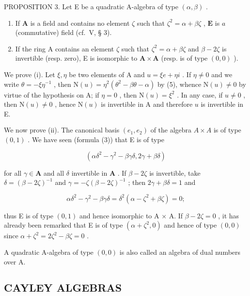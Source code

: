 PROPOSITION 3. Let E be a quadratic A-algebra of type \((\alpha, \beta)\) .

\begin{enumerate}
\def\labelenumi{(\roman{enumi})}
\item
  If \(\mathbf{A}\) is a field and contains no element \(\zeta\) such that \(\zeta^2 = \alpha + \beta \zeta\) , \(\mathbf{E}\) is \(a\) (commutative) field (cf.~V, § 3).
\item
  If the ring A contains an element \(\zeta\) such that \(\zeta^2 = \alpha + \beta\zeta\) and \(\beta - 2\zeta\) is invertible (resp. zero), E is isomorphic to \(\mathbf{A} \times \mathbf{A}\) (resp. is of type \((0,0)\) ).
\end{enumerate}

We prove (i). Let \(\xi, \eta\) be two elements of A and \(u = \xi e + \eta i\) . If \(\eta \neq 0\) and we write \(\theta = -\xi \eta^{-1}\) , then \(\mathrm{N}(u) = \eta^2 (\theta^2 - \beta \theta - \alpha)\) by (5), whence \(\mathrm{N}(u) \neq 0\) by virtue of the hypothesis on A; if \(\eta = 0\) , then \(\mathrm{N}(u) = \xi^2\) . In any case, if \(u \neq 0\) , then \(\mathrm{N}(u) \neq 0\) , hence \(\mathrm{N}(u)\) is invertible in A and therefore \(u\) is invertible in E.

We now prove (ii). The canonical basis \((e_{1}, e_{2})\) of the algebra \(A \times A\) is of type \((0, 1)\) . We have seen (formula (3)) that E is of type

\[
(\alpha \delta^ {2} - \gamma^ {2} - \beta \gamma \delta , 2 \gamma + \beta \delta)
\]

for all \(\gamma \in \mathbf{A}\) and all \(\delta\) invertible in \(\mathbf{A}\) . If \(\beta - 2\zeta\) is invertible, take \(\delta = (\beta - 2\zeta)^{-1}\) and \(\gamma = -\zeta(\beta - 2\zeta)^{-1}\) ; then \(2\gamma + \beta\delta = 1\) and

\[
\alpha \delta^ {2} - \gamma^ {2} - \beta \gamma \delta = \delta^ {2} (\alpha - \zeta^ {2} + \beta \zeta) = 0;
\]

thus E is of type \((0,1)\) and hence isomorphic to A × A. If \(\beta - 2\zeta = 0\) , it has already been remarked that E is of type \((\alpha + \zeta^{2}, 0)\) and hence of type \((0,0)\) since \(\alpha + \zeta^{2} = 2\zeta^{2} - \beta\zeta = 0\) .

A quadratic A-algebra of type \((0,0)\) is also called an algebra of dual numbers over A.

\subsection{CAYLEY ALGEBRAS}

